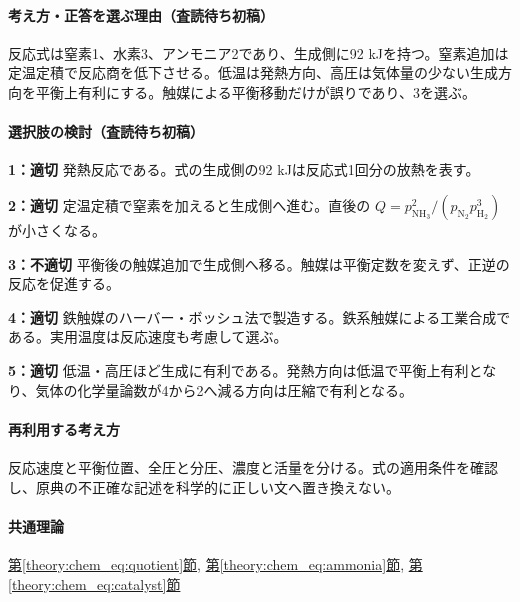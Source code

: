 \paragraph{考え方・正答を選ぶ理由（査読待ち初稿）} 反応式は窒素1、水素3、アンモニア2であり、生成側に92 kJを持つ。窒素追加は定温定積で反応商を低下させる。低温は発熱方向、高圧は気体量の少ない生成方向を平衡上有利にする。触媒による平衡移動だけが誤りであり、3を選ぶ。

\paragraph{選択肢の検討（査読待ち初稿）}\mbox{}\par

\noindent\textbf{1：適切} 発熱反応である。式の生成側の92 kJは反応式1回分の放熱を表す。\par

\noindent\textbf{2：適切} 定温定積で窒素を加えると生成側へ進む。直後の \(Q=p_{\mathrm{NH_3}}^2/(p_{\mathrm{N_2}}p_{\mathrm{H_2}}^3)\) が小さくなる。\par

\noindent\textbf{3：不適切} 平衡後の触媒追加で生成側へ移る。触媒は平衡定数を変えず、正逆の反応を促進する。\par

\noindent\textbf{4：適切} 鉄触媒のハーバー・ボッシュ法で製造する。鉄系触媒による工業合成である。実用温度は反応速度も考慮して選ぶ。\par

\noindent\textbf{5：適切} 低温・高圧ほど生成に有利である。発熱方向は低温で平衡上有利となり、気体の化学量論数が4から2へ減る方向は圧縮で有利となる。\par

\paragraph{再利用する考え方} 反応速度と平衡位置、全圧と分圧、濃度と活量を分ける。式の適用条件を確認し、原典の不正確な記述を科学的に正しい文へ置き換えない。

\paragraph{共通理論} \hyperref[theory:chem_eq:quotient]{第\ref*{theory:chem_eq:quotient}節}, \hyperref[theory:chem_eq:ammonia]{第\ref*{theory:chem_eq:ammonia}節}, \hyperref[theory:chem_eq:catalyst]{第\ref*{theory:chem_eq:catalyst}節}

